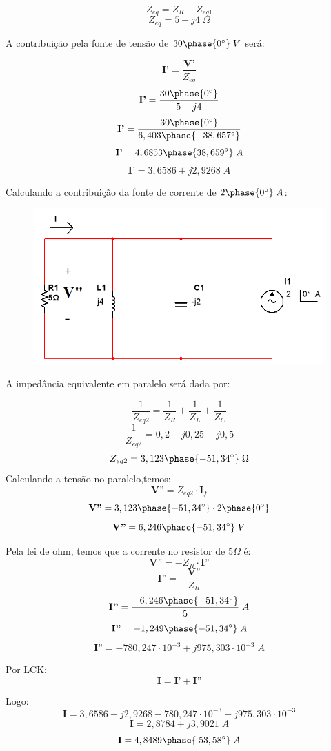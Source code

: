 \documentclass[
	12pt,				%
	oneside,			%
	a4paper,			%
	english,			%
	french,				%
	spanish,			%
	brazil				%
	]{abntex2}
\begin{document}
$$Z_{eq} = Z_R + Z_{eq1}$$
$$Z_{eq} = 5 - j4\;\Omega$$

A contribuição pela fonte de tensão de $30\phase{0^{\circ}}\;V$ será:

$$\textbf{I'} = \dfrac{\textbf{V'}}{Z_{eq}}$$
$$\textbf{I'} = \dfrac{30\phase{0^{\circ}}}{5 - j4}$$
$$\textbf{I'} = \dfrac{30\phase{0^{\circ}}}{6,403\phase{-38,657^{\circ}}}$$
$$\textbf{I'} = 4,6853\phase{38,659^{\circ}}\;A$$
$$\textbf{I'} = 3,6586 + j2,9268\;A$$

Calculando a contribuição da fonte de corrente de $2\phase{0^{\circ}}\;A$:

\begin{figure}[htb]
	\centering
	\includegraphics[scale=0.4]{25_2.PNG}
\end{figure}

A impedância equivalente em paralelo será dada por:

$$\dfrac{1}{Z_{eq2}} = \dfrac{1}{Z_R} + \dfrac{1}{Z_L} + \dfrac{1}{Z_C}$$
$$\dfrac{1}{Z_{eq2}} = 0,2 - j0,25 + j0,5$$
$$Z_{eq2} = 3,123\phase{-51,34^{\circ}}\;\Omega$$
Calculando a tensão no paralelo,temos:
$$\textbf{V''} = Z_{eq2}\cdot \textbf{I$_f$} $$
$$\textbf{V''} = 3,123\phase{-51,34^{\circ}}\cdot 2\phase{0^{\circ}}$$
$$\textbf{V''} = 6,246\phase{-51,34^{\circ}}\;V$$


Pela lei de ohm, temos que a corrente no resistor de 5$\Omega$ é:
\newline
$$\textbf{V''} = -Z_{R}\cdot \textbf{I''} $$
$$\textbf{I''} = -\dfrac{\textbf{V''}}{Z_R}$$
$$\textbf{I''} = \dfrac{-6,246\phase{-51,34^{\circ}}}{5}\;A$$
$$\textbf{I''} = -1,249\phase{-51,34^{\circ}}\;A$$
$$\textbf{I''} = -780,247\cdot10^{-3} + j975,303\cdot10^{-3}\;A$$

\newpage

Por LCK:
$$\textbf{I} = \textbf{I'} + \textbf{I''}$$

Logo:
$$\textbf{I} = 3,6586 + j2,9268 -780,247\cdot10^{-3} + j975,303\cdot10^{-3}$$
$$\textbf{I} = 2,8784 + j3,9021\;A$$
$$\textbf{I} = 4,8489\phase{\;53,58^{\circ}}\;A$$
\end{document}
